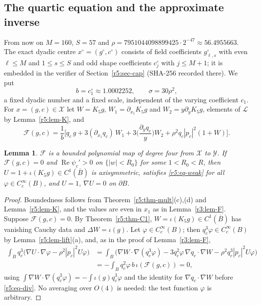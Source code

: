 \documentclass[11pt]{amsart}
\newtheorem{lemma}[theorem]{Lemma}
\theoremstyle{definition}
\theoremstyle{remark}
\numberwithin{equation}{section}
\newcommand{\Fc}{\mathcal{F}}
\DeclareMathOperator{\re}{Re}
\begin{document}
\subsection{The quartic equation and the approximate inverse}\label{r5:sec-quartic}

From now on $M=160$, $S=57$ and $\rho=7951044098899425\cdot2^{-47}\approx56.4955663$. The exact dyadic centre $x^\circ=(g^\circ,c^\circ)$ consists of field coefficients $g^\circ_{\ell,s}$ with even $\ell\leq M$ and $1\leq s\leq S$ and odd shape coefficients $c^\circ_j$ with $j\leq M+1$; it is embedded in the verifier of Section~\ref{r5:sec-cap} (SHA-256 recorded there). We put
\[
b=c^\circ_1\approx1.0002252,\qquad\sigma=30\rho^2,
\]
a fixed dyadic number and a fixed scale, independent of the varying coefficient $c_1$. For $x=(g,c)\in\mathcal X$ let $W=K_5g$, $W_1=\partial_{x_1}K_5g$ and $W_2=y\partial_yK_5g$, elements of $\mathcal L$ by Lemma~\ref{r5:lem-K}, and
\begin{equation}\label{r5:eq-F}
\Fc(g,c)=\frac1b\Big[q_c\,g+3(\partial_{x_1}q_c)\,W_1+3\Big(\frac{\partial_yq_c}y\Big)W_2+\rho^2q_c|p_c|^2(1+W)\Big].
\end{equation}

\begin{lemma}\label{r5:lem-F}
$\Fc$ is a bounded polynomial map of degree four from $\mathcal X$ to $\mathcal Y$. If $\Fc(g,c)=0$ and $\re\psi_c'>0$ on $\{|w|<R_0\}$ for some $1<R_0<R$, then $U=1+\iota(K_5g)\in C^1(\overline B)$ is axisymmetric, satisfies \eqref{r5:eq-weak} for all $\varphi\in C_c^\infty(B)$, and $U=1$, $\nabla U=0$ on $\partial B$.
\end{lemma}

\begin{proof}
Boundedness follows from Theorem~\ref{r5:thm-mult}(c),(d) and Lemma~\ref{r5:lem-K}, and the values are even in $x_1$ as in Lemma~\ref{r3:lem-F}. Suppose $\Fc(g,c)=0$. By Theorem~\ref{r5:thm-C1}, $W=\iota(K_5g)\in C^1(\overline B)$ has vanishing Cauchy data and $\Delta W=\iota(g)$. Let $\varphi\in C_c^\infty(B)$; then $q_c^3\varphi\in C_c^\infty(B)$ by Lemma~\ref{r5:lem-lift}(a), and, as in the proof of Lemma~\ref{r3:lem-F},
\begin{align*}
\int_Bq_c^3\big(\nabla U\cdot\nabla\varphi-\rho^2|p_c|^2U\varphi\big)&=\int_B\big(\nabla W\cdot\nabla(q_c^3\varphi)-3q_c^2\varphi\,\nabla q_c\cdot\nabla W-\rho^2q_c^3|p_c|^2U\varphi\big)\\
&=-\int_Bq_c^2\varphi\,b\,\iota(\Fc(g,c))=0,
\end{align*}
using $\int\nabla W\cdot\nabla(q_c^3\varphi)=-\int\iota(g)q_c^3\varphi$ and the identity for $\nabla q_c\cdot\nabla W$ before \eqref{r5:eq-div}. No averaging over $O(4)$ is needed: the test function $\varphi$ is arbitrary.
\end{proof}
\end{document}
